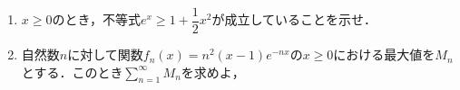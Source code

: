 \documentclass[../../main.tex]{subfiles}
\begin{document}
\begin{enumerate}
  \item $x\ge 0$のとき，不等式$e^x\ge 1+\dfrac{1}{2}x^2$が成立していることを示せ．
  \item 自然数$n$に対して関数$f_n(x)=n^2(x-1)e^{-nx}$の$x\ge 0$における最大値を$M_n$とする．このとき$\sum_{n=1}^{\infty}M_n$を求めよ，
\end{enumerate}
\end{document}
